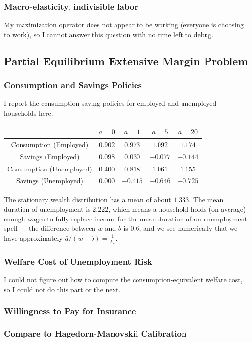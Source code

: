 \documentclass[12pt, letterpaper, parskip = full]{article}
\begin{document}
    \subsubsection{Macro-elasticity, indivisible labor}

    My maximization operator does not appear to be working (everyone is choosing to work), so I cannot answer this question with no time left to debug.

    \subsection{Partial Equilibrium Extensive Margin Problem}

    \subsubsection{Consumption and Savings Policies}

    I report the consumption-saving policies for employed and unemployed households here.

    \begin{center}
	\begin{tabular}{|c|c|c|c|c|}
		\hline
		 & \(a = 0\) & \(a = 1\) & \(a = 5\) & \(a = 20\) \\
		\hline
		Consumption (Employed) & \(0.902\) & \(0.973\) & \(1.092\) & \(1.174\) \\
		\hline
        Savings (Employed) & \(0.098\) & \(0.030\) & \(-0.077\) & \(-0.144\) \\
        \hline
        Consumption (Unemployed) & \(0.400\) & \(0.818\) & \(1.061\) & \(1.155\) \\
		\hline
        Savings (Unemployed) & \(0.000\) & \(-0.415\) & \(-0.646\) & \(-0.725\) \\
        \hline
	\end{tabular}
	\end{center}

    The stationary wealth distribution has a mean of about \(1.333\). The mean duration of unemployment is \(2.222\), which means a household holds (on average) enough wages to fully replace income for the mean duration of an unemployment spell --- the difference between \(w\) and \(b\) is \(0.6\), and we see numerically that we have approximately \( \bar{a}/(w-b) = \frac{1}{\lambda_w}\).

    \subsubsection{Welfare Cost of Unemployment Risk}

    I could not figure out how to compute the consumption-equivalent welfare cost, so I could not do this part or the next.

    \subsubsection{Willingness to Pay for Insurance}

    \subsubsection{Compare to Hagedorn-Manovskii Calibration}    
\end{document}
